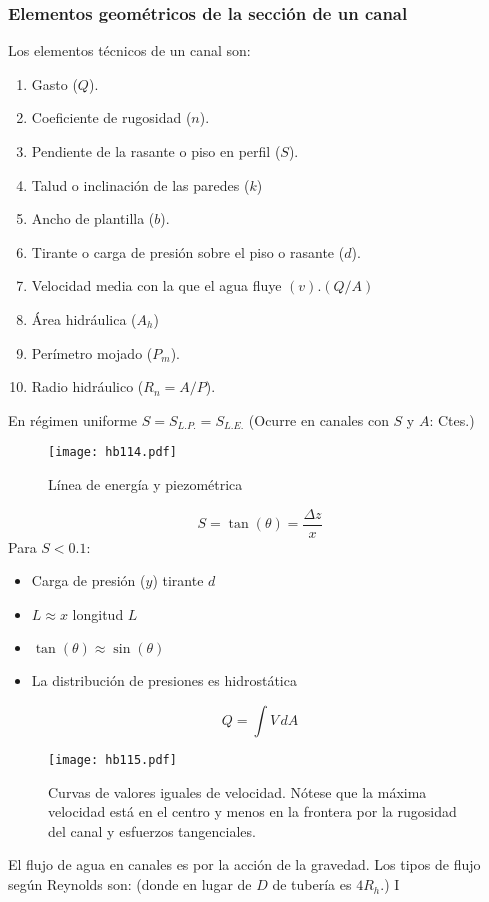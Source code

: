\subsubsection{Elementos geométricos de la sección de un canal}
Los elementos técnicos de un canal son:
\begin{enumerate}
    \item Gasto ($Q$).
    \item Coeficiente de rugosidad ($n$).
    \item Pendiente de la rasante o piso en perfil ($S$).
    \item Talud o inclinación de las paredes ($k$)
    \item Ancho de plantilla ($b$).
    \item Tirante o carga de presión sobre el piso o rasante ($d$). 
    \item Velocidad media con la que el agua fluye $(v). (Q/A)$
    \item Área hidráulica ($A_h$)
    \item Perímetro mojado ($P_m$).
    \item Radio hidráulico ($R_n=A/P$).
\end{enumerate}
En régimen uniforme $S=S_{L.P.}=S_{L.E.}$ (Ocurre en canales con $S$ y $A$: Ctes.)
\begin{figure}[h!]
\centering
  \texttt{[image: hb114.pdf]}
  \caption{Línea de energía y piezométrica}
  \label{hb114}
\end{figure}
\begin{equation}
    S = \tan{(\theta)} = \frac{\Delta z}{x} 
\end{equation}
Para $S<0.1$:
\begin{itemize}
    \item Carga de presión ($y$) tirante $d$
    \item $L\approx x$ longitud $L$
    \item $\tan{(\theta)}\approx \sin{(\theta)}$
    \item La distribución de presiones es hidrostática 
\end{itemize}
\begin{equation}
    Q =\int V\, dA
\end{equation}
\begin{figure}[h!]
\centering
  \texttt{[image: hb115.pdf]}
  \caption{Curvas de valores iguales de velocidad. Nótese que la máxima velocidad está en el centro y menos en la frontera por la rugosidad del canal y esfuerzos tangenciales.}
  \label{hb115}
\end{figure}
El flujo de agua en canales es por la acción de la gravedad. Los tipos de flujo según Reynolds son: (donde en lugar de $D$ de tubería es $4R_h$.) I


